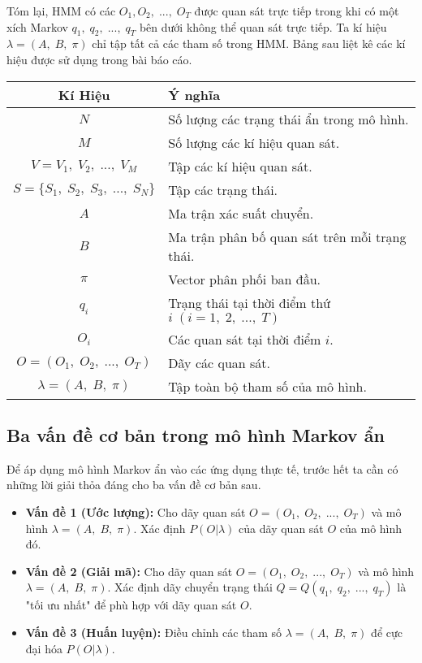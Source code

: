 Tóm lại, HMM có các $O_1, O_2, \; ..., \; O_T$ được quan sát trực tiếp trong khi có một xích Markov $q_1,\; q_2,\; ..., \; q_T$ bên dưới không thể quan sát trực tiếp. Ta kí hiệu $\lambda = (A,\; B,\; \pi)$ chỉ tập tất cả các tham số trong HMM. 
\newpage
Bảng sau liệt kê các kí hiệu được sử dụng trong bài báo cáo.


\begin{tabular}{|c|l|}
	\hline 
	\textbf{Kí Hiệu} & \hspace{3.3cm} \textbf{Ý nghĩa} \\ 
	\hline 
	$N$ & Số lượng các trạng thái ẩn trong mô hình. \\ 
	\hline 
	$M$ & Số lượng các kí hiệu quan sát. \\ 
	\hline 
	$V={V_1,\;V_2,\; ...,\; V_M}$ & Tập các kí hiệu quan sát. \\ 
	\hline 
	$S=\{S_1,\;S_2,\;S_3,\;..., \;S_N\}$ & Tập các trạng thái. \\ 
	\hline 
	$A$ & Ma trận xác suất chuyển. \\ 
	\hline 
	$B$ & Ma trận phân bố quan sát trên mỗi trạng thái. \\ 
	\hline 
	$\pi$ & Vector phân phối ban đầu. \\ 
	\hline 
	$q_i$ & Trạng thái tại thời điểm thứ $i \; (i=1,\;2,\; ...,\; T)$ \\ 
	\hline 
	$O_i$ & Các quan sát tại thời điểm $i$. \\
	\hline
	$O=(O_1,\; O_2,\; ...,\; O_T)$ & Dãy các quan sát.\\
	\hline
	$\lambda = (A,\; B,\; \pi)$ & Tập toàn bộ tham số của mô hình. \\
	\hline
\end{tabular}


\subsection{Ba vấn đề cơ bản trong mô hình Markov ẩn}
Để áp dụng mô hình Markov ẩn vào các ứng dụng thực tế, trước hết ta cần có những lời giải thỏa đáng cho ba vấn đề cơ bản sau.
\begin{itemize}
	\item \textbf{Vấn đề 1 (Ước lượng):}
	Cho dãy quan sát $O=(O_1,\; O_2,\; ...,\; O_T)$ và mô hình $\lambda = (A,\; B,\; \pi)$. Xác định $P(O|\lambda)$ của dãy quan sát $O$ của mô hình đó.
	
	\item \textbf{Vấn đề 2 (Giải mã):}
	Cho dãy quan sát $O=(O_1,\; O_2,\; ...,\; O_T)$ và mô hình $\lambda = (A,\; B,\; \pi)$. Xác định dãy chuyển trạng thái $Q=Q(q_1,\; q_2,\; ...,\; q_T)$ là "tối ưu nhất" để phù hợp với dãy quan sát $O$.
	
	\item \textbf{Vấn đề 3 (Huấn luyện):}
	Điều chỉnh các tham số $\lambda = (A,\; B,\; \pi)$ để cực đại hóa $P(O|\lambda)$.
\end{itemize}

